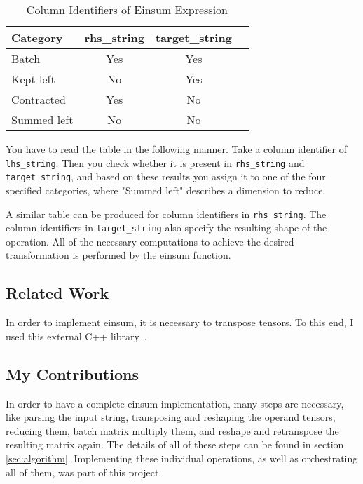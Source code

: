 \documentclass[sigconf]{acmart}
\begin{document}
\begin{table}[h!]
  \centering
  \caption{Column Identifiers of Einsum Expression}
  \label{tab:column_identifiers}
  \begin{tabular}{lccc}
    \toprule
    \textbf{Category} & \textbf{rhs\_string} & \textbf{target\_string} \\
    \midrule
    Batch              & Yes    & Yes    \\
    Kept left          & No     & Yes    \\
    Contracted         & Yes    & No     \\
    Summed left        & No     & No     \\
    \bottomrule
  \end{tabular}
\end{table}

You have to read the table in the following manner. Take a column identifier of \texttt{lhs\_string}. Then you check whether it is present in \texttt{rhs\_string} and \texttt{target\_string}, and based on these results you assign it to one of the four specified categories, where "Summed left" describes a dimension to reduce.

A similar table can be produced for column identifiers in \texttt{rhs\_string}. The column identifiers in \texttt{target\_string} also specify the resulting shape of the operation. All of the necessary computations to achieve the desired transformation is performed by the einsum function.

\subsection{Related Work}
In order to implement einsum, it is necessary to transpose tensors. To this end, I used {this external C++ library}~\cite{hptt2017}.

\subsection{My Contributions}
In order to have a complete einsum implementation, many steps are necessary, like parsing the input string, transposing and reshaping the operand tensors, reducing them, batch matrix multiply them, and reshape and retranspose the resulting matrix again. The details of all of these steps can be found in section \ref{sec:algorithm}. Implementing these individual operations, as well as orchestrating all of them, was part of this project.
\end{document}
